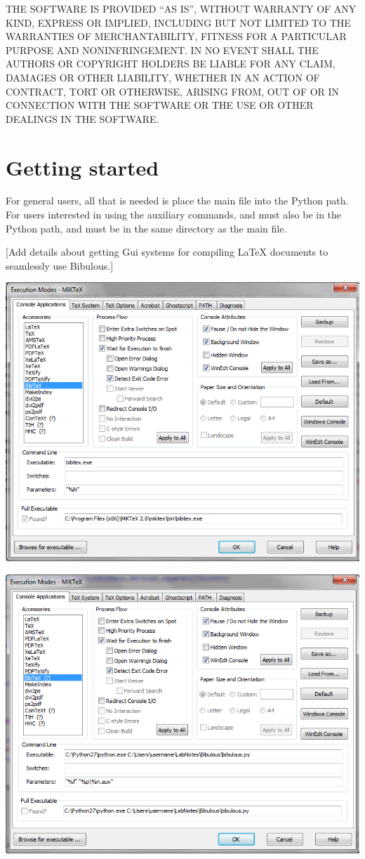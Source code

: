 \documentclass[letterpaper,10pt,english]{sphinxmanual}
\begin{document}
THE SOFTWARE IS PROVIDED ``AS IS'', WITHOUT WARRANTY OF ANY KIND, EXPRESS OR IMPLIED, INCLUDING BUT
NOT LIMITED TO THE WARRANTIES OF MERCHANTABILITY, FITNESS FOR A PARTICULAR PURPOSE AND
NONINFRINGEMENT. IN NO EVENT SHALL THE AUTHORS OR COPYRIGHT HOLDERS BE LIABLE FOR ANY CLAIM,
DAMAGES OR OTHER LIABILITY, WHETHER IN AN ACTION OF CONTRACT, TORT OR OTHERWISE, ARISING FROM, OUT
OF OR IN CONNECTION WITH THE SOFTWARE OR THE USE OR OTHER DEALINGS IN THE SOFTWARE.


\chapter{Getting started}
\label{getting_started:getting-started}\label{getting_started::doc}
For general users, all that is needed is place the main  file into the Python path. For users interested in using the auxiliary commands,  and  must also be in the Python path, and must be in the same directory as the main file.

{[}Add details about getting Gui systems for compiling LaTeX documents to seamlessly use Bibulous.{]}

\includegraphics{original_Winedt5_setup.png}

\includegraphics{modified_Winedt5_setup.png}
\end{document}
